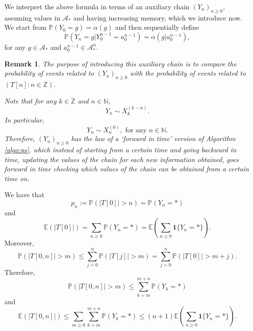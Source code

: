 \documentclass[a4paper]{article}
\newtheorem{remark}{Remark}%
\def\P{{\mathbb P}}
\newcommand{\E}{\mathbb{E}}
\newcommand{\Z}{\mathbb{Z}}
\newcommand{\N}{\mathbb{N}}
\newcommand{\A}{\mathcal{A}}
\begin{document}
We interpret the above formula in terms of an auxiliary chain 
$(Y_n)_{n\geq 0}$, %
assuming values in $\A_*$ and having increasing memory, which we introduce now. We start from 
$\P(Y_0=g)=\alpha(g)$ and then sequentially define 
$$
\P(Y_n=g|Y_0^{n-1}=a_0^{n-1})=\alpha(g|a_0^{n-1}),
$$
for any $g\in \A_*$ and $a_0^{n-1} \in \A_*^n$. 

\begin{remark}
The purpose of introducing this auxiliary chain is to compare the probability of events related to $(Y_n)_{n\geq 0}$ with the probability of events related to $(T[n]:n\in \Z)$. %

Note that for any $k\in \Z$ and $n\in \N$,
$$
Y_n \sim X_{k}^{(k-n)}.
$$
In particular,
$$
Y_n \sim X_{n}^{(0)}, \text{ for any } n\in \N.
$$
Therefore, $(Y_n)_{n\geq 0}$ has the law of a `forward in time' version of Algorithm \ref{algo:ps}, which instead of starting from a certain time and going backward in time, updating the values of the chain for each new information obtained, goes forward in time checking which values of the chain can be obtained from a certain time on. %
\end{remark}

We have that
\begin{equation}\label{eq:pn}
p_n:=\P(|T[0]|>n)=\P(Y_n=*)
\end{equation}
and
\begin{equation}\label{eq:ET0}
\E(|T[0]|)=\sum_{n\geq 0} \P(Y_n=*)=\E\left(\sum_{n\geq 0} \mathbf{1}\{Y_n=*\}\right).
\end{equation}
Moreover,  
$$
\P(|T[0,n]|>m) \leq \sum_{j=0}^n\P(|T[j]|>m)=\sum_{j=0}^n\P(|T[0]|>m+j).
$$
Therefore,
\begin{equation} \label{eq:t0nbound}
\P(|T[0,n]|>m)\leq \sum_{k=m}^{m+n}\P(Y_k=*)
\end{equation}
and
\begin{equation} \label{eq:t0n}
\E(|T[0,n]|) \leq \sum_{m\geq 0} \sum_{k=m}^{m+n}\P(Y_k=*)\leq (n+1) \E\left(\sum_{n\geq 0} \mathbf{1}\{Y_n=*\}\right).
\end{equation}

\end{document}
